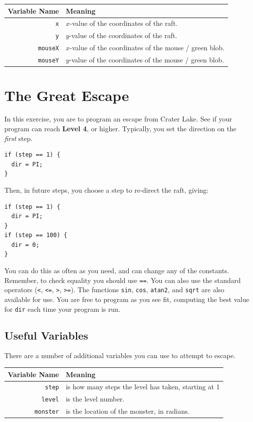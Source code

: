 \documentclass[titlepage]{article}
\newcommand{\drawbox}[1]{\noindent\shadowbox{\parbox{\linewidth-8pt}{\vspace{#1em}~}}\newline}
\begin{document}
\begin{center}
\noindent
\begin{tabular}{rl}
\hline
{\bf Variable Name}     & Meaning\\
\hline
\verb|x|                & $x$-value of the coordinates of the raft.\\
\verb|y|                & $y$-value of the coordinates of the raft.\\
\verb|mouseX|           & $x$-value of the coordinates of the mouse / green blob.\\
\verb|mouseY|           & $y$-value of the coordinates of the mouse / green blob.\\
\hline
\end{tabular}        
\end{center}

\newpage

\section{The Great Escape}

In this exercise, you are to program an escape from Crater Lake.
See if your program can reach {\bf Level 4}, or higher.
%
Typically, you set the direction on the {\em first\/} step.
\begin{verbatim}
if (step == 1) {
  dir = PI;
}  
\end{verbatim}

Then, in future steps, you choose a step to re-direct the raft, giving:
\begin{verbatim}
if (step == 1) {
  dir = PI;
}  
if (step == 100) {
  dir = 0;
}
\end{verbatim}
You can do this as often as you need, and can change any of the constants.
Remember, to check equality
you should use \verb|==|. You
can also use the standard operators (\verb$<$, \verb$<=$, \verb$>$, \verb$>=$). 
The functions \verb|sin|, \verb|cos|, \verb|atan2|, and \verb|sqrt| are also available for use.
You are free to program as you see fit, computing the best value
for \verb|dir| each time your program is run.

\drawbox{25}

\subsection*{Useful Variables}

There are a number of additional variables you can use to attempt to escape.

\begin{center}
\noindent
\begin{tabular}{rl}
\hline
{\bf Variable Name}     & Meaning\\
\hline
\verb|step|             & is how many steps the level has taken, starting at 1\\
\verb|level|            & is the level number.\\
\verb|monster|          & is the location of the monster, in radians.\\
\hline
\end{tabular}        
\end{center}
\end{document}
